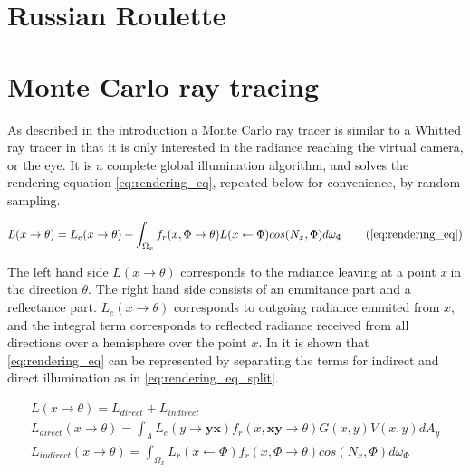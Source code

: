 \documentclass[]{report}   %
\begin{document}
\section{Russian Roulette}

\section{Monte Carlo ray tracing}
As described in the introduction a Monte Carlo ray tracer is similar to a Whitted ray tracer in that it is only interested in the radiance reaching the virtual camera, or the eye.
It is a complete global illumination algorithm, and solves the rendering equation \autoref{eq:rendering_eq}, repeated below for convenience, by random sampling.

\begin{equation}
L(x \rightarrow \theta) = L_e(x \rightarrow \theta) + \int_{\Omega_x} f_r(x, \Phi \rightarrow \theta)L(x \leftarrow \Phi)cos(N_x, \Phi)d\omega_{\Phi}
\tag{\ref{eq:rendering_eq}}
\end{equation}

The left hand side $L(x \rightarrow \theta)$ corresponds to the radiance leaving at a point \emph{x} in the direction $\theta$.
The right hand side consists of an emmitance part and a reflectance part.
$ L_e(x \rightarrow \theta)$ corresponds to outgoing radiance emmited from $x$, and the integral term corresponds to reflected radiance received from all directions over a hemisphere over the point $x$.
In \cite{dutre} it is shown that \autoref{eq:rendering_eq} can be represented by separating the terms for indirect and direct illumination as in \autoref{eq:rendering_eq_split}.


\begin{subequations} \label{eq:rendering_eq_split}
\begin{align} 
L(x \rightarrow \theta) = L_{direct}+L_{indirect} \\
L_{direct}(x \rightarrow \theta) = \int_A L_e(y \rightarrow \mathbf{yx})f_r(x, \mathbf{xy}\rightarrow \theta)G(x,y)V(x,y)dA_y \\
L_{indirect}(x \rightarrow \theta) = \int_{\Omega_x} L_r(x \leftarrow \Phi) f_r(x, \Phi \rightarrow \theta)cos(N_x, \Phi)d\omega_{\Phi}
\end{align}
\end{subequations}
\end{document}
